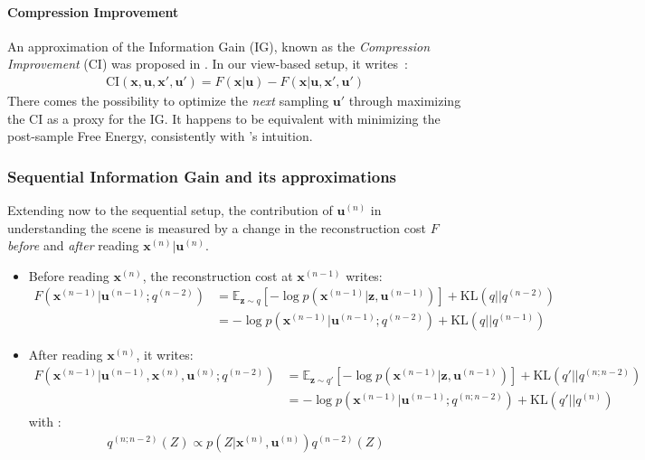 \documentclass[12pt,twoside,openright]{article}
\begin{document}
\paragraph{Compression Improvement}
An approximation of the Information Gain (IG), known as the \emph{Compression Improvement} (CI) was proposed in \citet{schmidhuber2007simple,houthooft2016vime}. In our view-based setup, it
writes~:
\begin{align}
	\text{CI}(\boldsymbol{x},\boldsymbol{u}, \boldsymbol{x}', \boldsymbol{u}') = F(\boldsymbol{x}|\boldsymbol{u}) - F(\boldsymbol{x}|\boldsymbol{u}, \boldsymbol{x}', \boldsymbol{u}') \label{eq:CI-base}
\end{align}	
There comes the possibility to  {\color{Purple}optimize the \emph{next} sampling $\boldsymbol{u}'$ through maximizing the CI as a proxy for the IG. It happens 
	to be equivalent with minimizing the post-sample Free Energy, consistently with \citet{friston2012perceptions}'s intuition.}

\subsubsection{Sequential Information Gain and its approximations}

{\color{Purple} Extending now to the sequential setup}, the contribution of $\boldsymbol{u}^{(n)}$ in understanding the scene is measured by a change in the reconstruction cost $F$ \emph{before} and \emph{after} reading $\boldsymbol{x}^{(n)}|\boldsymbol{u}^{(n)}$.
\begin{itemize}
	\item Before {\color{Purple} reading $\boldsymbol{x}^{(n)}$}, the reconstruction cost at $\boldsymbol{x}^{(n-1)}$ writes:
	\begin{align}
		F(\boldsymbol{x}^{(n-1)}|\boldsymbol{u}^{(n-1)}; q^{(n-2)}) 
		&= \mathbb{E}_{\boldsymbol{z} \sim q} \left[-\log p(\boldsymbol{x}^{(n-1)}| \boldsymbol{z}, \boldsymbol{u}^{(n-1)} )
		\right] + \text{KL}(q||q^{(n-2)}) \label{eq:F_pre_var}\\
		&= -\log p(\boldsymbol{x}^{(n-1)}|\boldsymbol{u}^{(n-1)}; q^{(n-2)}) + \text{KL} (q||q^{(n-1)})\label{eq:F_pre_KL}
	\end{align}
	\item After {\color{Purple} reading $\boldsymbol{x}^{(n)}$}, it writes:
	\begin{align}
		F(\boldsymbol{x}^{(n-1)}|\boldsymbol{u}^{(n-1)},\boldsymbol{x}^{(n)},\boldsymbol{u}^{(n)}; q^{(n-2)}) 
		&= \mathbb{E}_{\boldsymbol{z} \sim q'} \left[-\log p(\boldsymbol{x}^{(n-1)}| \boldsymbol{z}, \boldsymbol{u}^{(n-1)} )
		\right] + \text{KL}(q'||q^{(n;n-2)}) \label{eq:F_post_var}\\
		&= -\log p(\boldsymbol{x}^{(n-1)}|\boldsymbol{u}^{(n-1)}; q^{(n;n-2)}) + \text{KL} (q'||q^{(n)})\label{eq:F_post_KL}
	\end{align}
	with :
	\begin{align}
		q^{(n; n-2)}(Z) \propto p(Z|\boldsymbol{x}^{(n)}, \boldsymbol{u}^{(n)})q^{(n-2)}(Z)\label{eq:n-n-2}
	\end{align}
\end{itemize}
\end{document}
